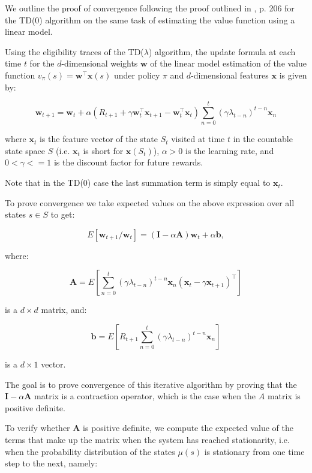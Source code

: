 \documentclass[11pt,A4paper]{article}
\begin{document}
We outline the proof of convergence following the proof outlined in \cite{sutton-barto-2018}, p. 206 for the TD(0) algorithm on the same task of estimating the value function using a linear model.

Using the eligibility traces of the TD($\lambda$) algorithm, the update formula at each time $t$ for the $d$-dimensional weights $\mathbf{w}$ of the linear model estimation of the value function $v_\pi(s) = \mathbf{w}^\intercal \mathbf{x}(s)$ under policy $\pi$ and $d$-dimensional features $\mathbf{x}$ is given by:

\[
\mathbf{w}_{t+1} = \mathbf{w}_t + \alpha (R_{t+1} + \gamma \mathbf{w}_t^\intercal \mathbf{x}_{t+1} - \mathbf{w}_t^\intercal \mathbf{x}_t)
						\sum_{n=0}^{t}{ (\gamma \lambda_{t-n})^{t-n} \mathbf{x}_n}
\]

where $\mathbf{x}_t$ is the feature vector of the state $S_t$ visited at time $t$ in the countable state space $S$ (i.e. $\mathbf{x}_t$ is short for $\mathbf{x}(S_t)$), $\alpha > 0$ is the learning rate, and $0 < \gamma <= 1$ is the discount factor for future rewards.

Note that in the TD(0) case the last summation term is simply equal to $\mathbf{x}_t$.

\medskip

To prove convergence we take expected values on the above expression over all states $s \in S$ to get:

\[ E[ \mathbf{w}_{t+1} / \mathbf{w}_t ] = (\mathbf{I} - \alpha \mathbf{A}) \mathbf{w}_t + \alpha \mathbf{b}, \]

where:

\[ \mathbf{A} = E[ \sum_{n=0}^{t}{ (\gamma \lambda_{t-n})^{t-n} \mathbf{x}_n ( \mathbf{x}_t - \gamma \mathbf{x}_{t+1} )^\intercal } ] \]

is a $d \times d$ matrix, and:

\[ \mathbf{b} = E[ R_{t+1} \sum_{n=0}^{t}{ (\gamma \lambda_{t-n})^{t-n} \mathbf{x}_n} ] \]

is a $d \times 1$ vector.

The goal is to prove convergence of this iterative algorithm by proving that the $\mathbf{I} - \alpha \mathbf{A}$ matrix is a contraction operator, which is the case when the $A$ matrix is positive definite.

To verify whether $\mathbf{A}$ is positive definite, we compute the expected value of the terms that make up the matrix when the system has reached stationarity, i.e. when the probability distribution of the states $\mu(s)$ is stationary from one time step to the next, namely:
\end{document}
